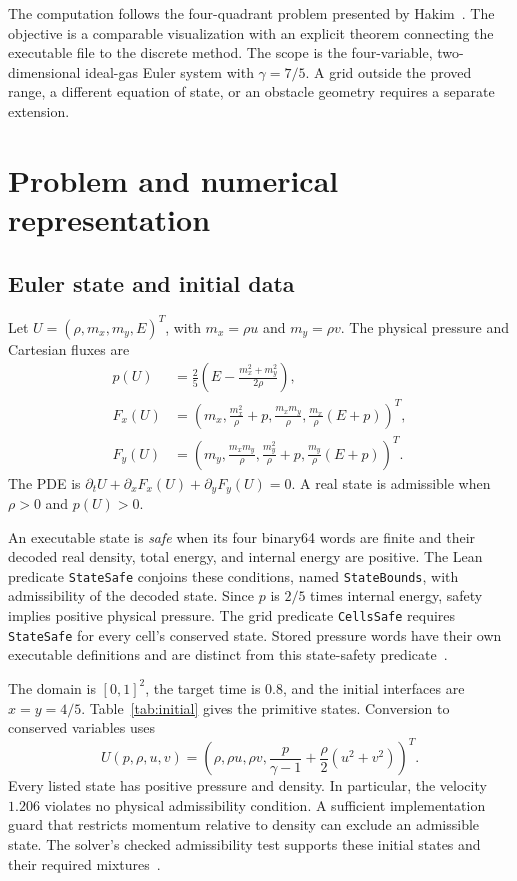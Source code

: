 \documentclass[11pt]{article}
\newcommand{\code}[1]{\texttt{#1}}
\begin{document}
The computation follows the four-quadrant problem presented by Hakim~\cite{lanyon}.  The objective is a comparable visualization with an explicit theorem connecting the executable file to the discrete method.  The scope is the four-variable, two-dimensional ideal-gas Euler system with $\gamma=7/5$.  A grid outside the proved range, a different equation of state, or an obstacle geometry requires a separate extension.

\section{Problem and numerical representation}

\subsection{Euler state and initial data}

Let $U=(\rho,m_x,m_y,E)^T$, with $m_x=\rho u$ and $m_y=\rho v$.  The physical pressure and Cartesian fluxes are
\begin{align}
p(U)&=\frac25\left(E-\frac{m_x^2+m_y^2}{2\rho}\right),\label{eq:pressure}\\
F_x(U)&=\left(m_x,\frac{m_x^2}{\rho}+p,\frac{m_xm_y}{\rho},\frac{m_x}{\rho}(E+p)\right)^T,\label{eq:flux}\\
F_y(U)&=\left(m_y,\frac{m_xm_y}{\rho},\frac{m_y^2}{\rho}+p,\frac{m_y}{\rho}(E+p)\right)^T.
\end{align}
The PDE is $\partial_t U+\partial_xF_x(U)+\partial_yF_y(U)=0$.  A real state is admissible when $\rho>0$ and $p(U)>0$.

An executable state is \emph{safe} when its four binary64 words are finite and their decoded real density, total energy, and internal energy are positive.  The Lean predicate \code{StateSafe} conjoins these conditions, named \code{StateBounds}, with admissibility of the decoded state.  Since $p$ is $2/5$ times internal energy, safety implies positive physical pressure.  The grid predicate \code{CellsSafe} requires \code{StateSafe} for every cell's conserved state.  Stored pressure words have their own executable definitions and are distinct from this state-safety predicate~\cite{statesafety}.

The domain is $[0,1]^2$, the target time is $0.8$, and the initial interfaces are $x=y=4/5$.  Table~\ref{tab:initial} gives the primitive states.  Conversion to conserved variables uses
\begin{equation}
U(p,\rho,u,v)=\left(\rho,\rho u,\rho v,\frac{p}{\gamma-1}+\frac{\rho}{2}(u^2+v^2)\right)^T.
\end{equation}
Every listed state has positive pressure and density.  In particular, the velocity $1.206$ violates no physical admissibility condition.  A sufficient implementation guard that restricts momentum relative to density can exclude an admissible state.  The solver's checked admissibility test supports these initial states and their required mixtures~\cite{initial}.
\end{document}
